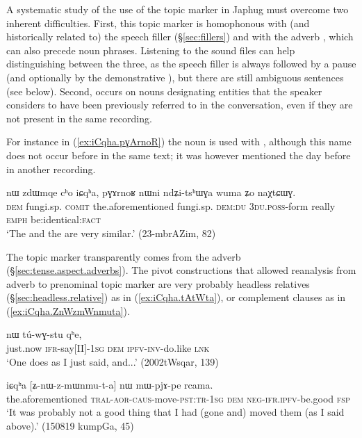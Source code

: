 A systematic study of the use of the topic marker  in Japhug must overcome two inherent difficulties. First, this topic marker is homophonous with (and historically related to) the speech filler  (§\ref{sec:fillers}) and with the adverb , which can also precede noun phrases. Listening to the sound files can help distinguishing between the three, as the speech filler is always followed by a pause (and optionally by the demonstrative ), but there are still ambiguous sentences (see below). Second,  occurs on nouns designating entities that the speaker considers to have been previously referred to in the conversation, even if they are not present in the same recording. 

For instance in (\ref{ex:iCqha.pɣArnoR}) the noun  is used with , although this name does not occur before in the same text; it was however mentioned the day before in another recording.

\begin{exe}
\ex \label{ex:iCqha.pɣArnoR}
\gll nɯ zdɯmqe cʰo iɕqʰa, pɣɤrnoʁ nɯni ndʑi-tsʰɯɣa wuma ʑo naχtɕɯɣ. \\
\textsc{dem} fungi.sp. \textsc{comit} the.aforementioned fungi.sp. \textsc{dem}:\textsc{du} \textsc{3du}.\textsc{poss}-form really \textsc{emph} be:identical:\textsc{fact} \\
\glt `The  and the  are very similar.' (23-mbrAZim, 82)
\end{exe}

 
The topic marker  transparently comes from the adverb  (§\ref{sec:tense.aspect.adverbs}). The pivot constructions that allowed reanalysis from adverb to prenominal topic marker are very probably headless relatives (§\ref{sec:headless.relative}) as in  (\ref{ex:iCqha.tAtWta}), or complement clauses as in (\ref{ex:iCqha.ZnWzmWnmuta}). 

\begin{exe}
\ex \label{ex:iCqha.tAtWta}
  nɯ tú-wɣ-stu qʰe, \\
 just.now \textsc{ifr}-say[II]-\textsc{1sg} \textsc{dem} \textsc{ipfv}-\textsc{inv}-do.like \textsc{lnk} \\
\glt `One does as I just said, and...' (2002tWsqar, 139)
\end{exe}

\begin{exe}
\ex \label{ex:iCqha.ZnWzmWnmuta}
 \gll iɕqʰa [ʑ-nɯ-z-mɯnmu-t-a] nɯ mɯ-pjɤ-pe rcama.  \\
the.aforementioned  \textsc{tral}-\textsc{aor}-\textsc{caus}-move-\textsc{pst}:\textsc{tr}-\textsc{1sg} \textsc{dem} \textsc{neg}-\textsc{ifr}.\textsc{ipfv}-be.good \textsc{fsp} \\
\glt `It was probably not a good thing that I had (gone and) moved them (as I said above).' (150819 kumpGa, 45)
 \end{exe}
 
